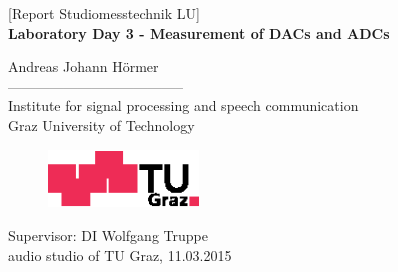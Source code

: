 \documentclass[11pt]{report}
\begin{document}
\begin{titlepage}
\begin{center}
  \vspace*{0.5cm}
  {\LARGE [Report Studiomesstechnik LU]} \\
  \vspace{15mm}
  {\huge \bf Laboratory Day 3 - Measurement of DACs and ADCs \\}

  \vspace{15mm}
  {\LARGE Andreas Johann H\"ormer} \\
  \vspace{10mm}%
  -------------------------------------- \\
  \vspace{10mm}%
  \large
  Institute for signal processing and speech communication \\
  Graz University of Technology \\


  \vspace{15mm}%
  \begin{figure}[!ht]
  \begin{center}
  \centerline{\includegraphics[width=4cm,keepaspectratio=true]{TULogoneu}}
  \end{center}
  \end{figure}
  \vspace{10mm}
Supervisor: DI Wolfgang Truppe \\
  \vfill
  audio studio of TU Graz, 11.03.2015
  \vspace{0.5cm}
\end{center}
\end{titlepage}

\end{document}
